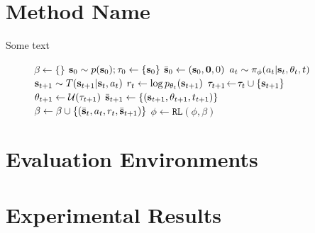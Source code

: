 \documentclass{article}
\begin{document}
\section{Method Name}
\label{sec:method} 

Some text

\begin{figure}
\vspace{-0.25cm}
\begin{minipage}{.5\textwidth}
\begin{algorithm}[H]
\footnotesize 	
\caption{\methodName}
\label{alg:training}
\begin{algorithmic}[1]
\State $\beta\gets \{\}$ 
\State $\mathbf{s}_0 \sim p(\mathbf{s}_0); \tau_0 \gets  \{\mathbf{s}_0\}$ 
\State $\bar{\mathbf{s}}_0 \gets (\mathbf{s}_0, \mathbf{0}, 0)$ 
\State $a_{t} \sim \pi_\phi(a_t| \mathbf{s}_{t}, \theta_{t}, t)$
\State $\mathbf{s}_{t+1} \sim T(\mathbf{s}_{t+1} | \mathbf{s}_{t}, a_{t})$  
\State $r_{t} \gets  \log p_{\theta_{t}}(\mathbf{s}_{t+1})$ 
\State $\tau_{t+1}\!\gets\!\tau_t\cup \{\mathbf{s}_{t+1}\}$ 
\State $\theta_{t+1} \gets \mathcal{U}(\tau_{t+1})$ 
\State $\bar{\mathbf{s}}_{t+1} \gets \{( \mathbf{s}_{t+1}, \theta_{t+1}, t_{t+1})\}$
\State $\beta \gets \beta \cup \{(\bar{\mathbf{s}}_{t}, a_t, r_t, \bar{\mathbf{s}}_{t+1})\}$
\EndFor
\EndForEach
\State $\phi \gets \texttt{RL} (\phi, \beta)$ 
\EndWhile
\end{algorithmic}
\end{algorithm}
\end{minipage}
\vspace{-0.25cm}
\end{figure}

\section{Evaluation Environments}
\label{sec:envs}

\section{Experimental Results}
\label{sec:results}
\end{document}
